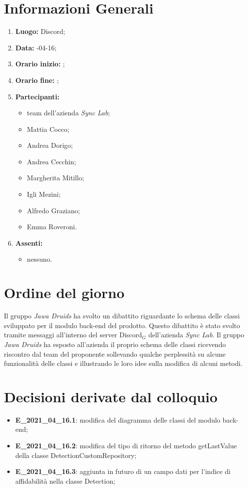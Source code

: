 \newpage
\section{Informazioni Generali}
\begin{enumerate}
	\item \textbf{Luogo:} \normalfont Discord;
	\item \textbf{Data:} -04-16;
	\item \textbf{Orario inizio:} ;
	\item \textbf{Orario fine:} ;
	\item \textbf{Partecipanti:}
	\begin{itemize}
		\item team dell'azienda \textit{Sync Lab};
		\item Mattia Cocco;
		\item Andrea Dorigo;
		\item Andrea Cecchin;
		\item Margherita Mitillo;
		\item Igli Mezini;
		\item Alfredo Graziano;
		\item Emma Roveroni.
	\end{itemize}
	\item \textbf{Assenti:}
	\begin{itemize}
		\item nessuno.
	\end{itemize}
\end{enumerate}
\section{Ordine del giorno}
Il gruppo \textit{Jawa Druids} ha svolto un dibattito riguardante lo schema delle classi sviluppato per il modulo back-end del prodotto. 
Questo dibattito è stato svolto tramite messaggi all'interno del server Discord$_G$ dell'azienda \textit{Sync Lab}.
Il gruppo \textit{Jawa Druids} ha esposto all'azienda il proprio schema delle classi ricevendo riscontro dal team del proponente sollevando qualche perplessità su alcune funzionalità delle classi e illustrando le loro idee sulla modifica di alcuni metodi.
\section{Decisioni derivate dal colloquio}
\begin{itemize}
	\item \textbf{E\_2021\_04\_16.1}: modifica del diagramma delle classi del modulo back-end;
	\item \textbf{E\_2021\_04\_16.2}: modifica del tipo di ritorno del metodo getLastValue della classe DetectionCustomRepository;
	\item \textbf{E\_2021\_04\_16.3}: aggiunta in futuro di un campo dati per l'indice di affidabilità nella classe Detection;
\end{itemize}